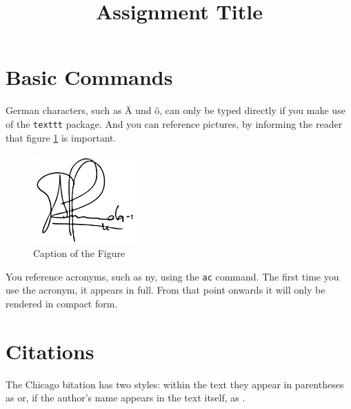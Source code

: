 \documentclass[
    12pt                               %
    ]{article}
\author{}                             %
\title{Assignment Title}
\begin{document}
  

\maketitle

\settowidth{\parindent}{~~~~~}

\tableofcontents
\listoffigures
\listoftables


%
%

\section{Basic Commands}

German characters, such as Ä und ö, can only be typed directly if you
make use of the \texttt{texttt} package. And you can reference pictures,
by informing the reader that figure \ref{fig:name-of-fig} is important.

\begin{figure}[t]
\includegraphics[width=4cm]{signature.png}
\centering
\caption{Caption of the Figure}
\label{fig:name-of-fig}
\end{figure}

You reference acronyms, such as \ac{ny}, using the \texttt{ac} command.
The first time you use the acronym, it appears in full. From that point
onwards it will only be rendered in compact form.


\section{Citations}

The Chicago bitation has two styles: within the text they appear in 
parentheses as \citep{zorlu2005effect} or, if the author’s name appears
in the text itself, as \citet{zorlu2005effect}.


%
%
\end{document}

